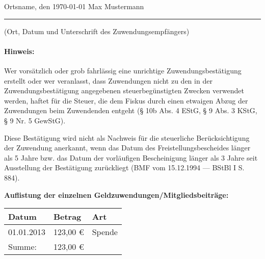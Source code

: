 \documentclass[12pt,ngerman]{scrartcl}
\begin{document}
\vspace*{2.5em} 

Ortsname, den \today \hspace*{20em} Max Mustermann

\hrule

\vspace*{0.5em} (Ort, Datum und Unterschrift des Zuwendungsempfängers) 

\paragraph{Hinweis:} Wer vorsätzlich oder grob fahrlässig eine unrichtige Zuwendungsbestätigung erstellt oder wer veranlasst, dass 
Zuwendungen nicht zu den in der Zuwendungsbestätigung angegebenen steuerbegünstigten Zwecken verwendet 
werden, haftet für die Steuer, die dem Fiskus durch einen etwaigen Abzug der Zuwendungen beim Zuwendenden entgeht (§ 10b Abs. 4 EStG, § 9 Abs. 3 KStG, § 9 Nr. 5 GewStG). 

Diese Bestätigung wird nicht als Nachweis für die steuerliche Berücksichtigung der Zuwendung anerkannt, wenn das Datum des Freistellungsbescheides länger als 5 Jahre bzw. das Datum der vorläufigen Bescheinigung länger als 3 Jahre seit Ausstellung der Bestätigung zurückliegt (BMF vom 15.12.1994 --- BStBl I S. 884). 

\clearpage

{\bfseries\large Auflistung der einzelnen Geldzuwendungen/Mitgliedsbeiträge:} \vspace*{2em}

\begin{tabular}{p{}p{}p{}} \toprule
\bfseries Datum & \bfseries Betrag & \bfseries Art \\ \midrule
01.01.2013 & 123,00 \euro & Spende \\ \midrule[1pt]
Summe: & 123,00 \euro& \\ \bottomrule[1pt]\bottomrule[1pt]
\end{tabular}
\end{document}
